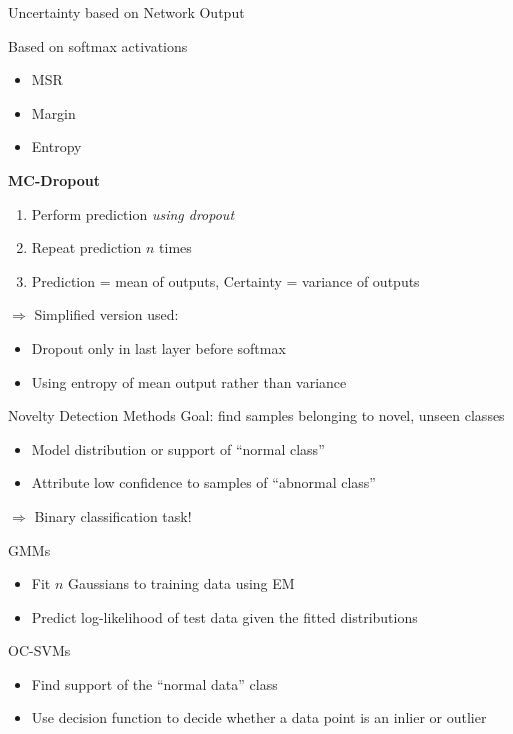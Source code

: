 \documentclass{beamer}
\begin{document}
\begin{frame}{Uncertainty based on Network Output}

\begin{block}{Based on softmax activations}
\begin{itemize}
	\item \gls{MSR}
	\item Margin
	\item Entropy
\end{itemize}	
\end{block}

\begin{block}{\textbf{\gls{MC-Dropout}}}
	\begin{enumerate}
		\item Perform prediction \textit{using dropout}
		\item Repeat prediction $n$ times
		\item Prediction = mean of outputs, Certainty = variance of outputs
	\end{enumerate}
	$\Rightarrow$ Simplified version used:
	\begin{itemize}
		\item Dropout only in last layer before softmax
		\item Using entropy of mean output rather than variance
	\end{itemize}
\end{block}
\end{frame}


\begin{frame}{Novelty Detection Methods}
Goal: find samples belonging to novel, unseen classes
\begin{itemize}
	\item Model distribution or support of ``normal class''
	\item Attribute low confidence to samples of ``abnormal class''
\end{itemize}
$\Rightarrow$ Binary classification task!
\begin{block}{\glspl{GMM}}
\begin{itemize}
	\item Fit $n$ Gaussians to training data using \gls{EM}
	\item Predict log-likelihood of test data given the fitted distributions
\end{itemize}
\end{block}
\begin{block}{\glspl{OC-SVM}}
	\begin{itemize}
		\item Find support of the ``normal data'' class
		\item Use decision function to decide whether a data point is an inlier or outlier
	\end{itemize}
\end{block}
\end{frame}
\end{document}

